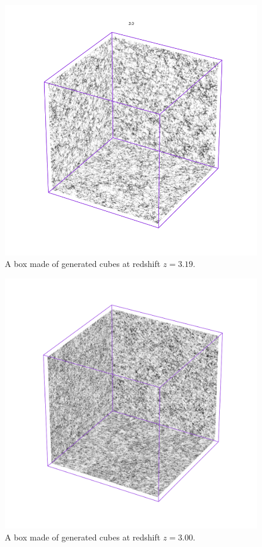 \documentclass[twocolumn]{article}
\numberwithin{equation}{section}
\begin{document}
\begin{figure}[!ht]%
\includegraphics[width=\columnwidth]{figures/cubes/mill_box_3.png}
\centering
\caption{A box made of generated cubes at redshift $z=3.19$.}
\label{fig:kernel_fig}
\end{figure}

\begin{figure}[!ht]%
\includegraphics[width=\columnwidth]{figures/cubes/gen_box_9_z3.png}
\centering
\caption{A box made of generated cubes at redshift $z=3.00$.}
\label{fig:kernel_fig}
\end{figure}
\end{document}
